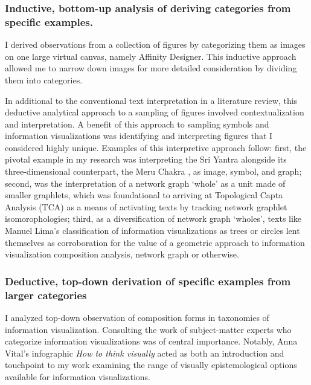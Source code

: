 \subsubsection{Inductive, bottom-up analysis of deriving categories from specific examples.}
I derived observations from a collection of figures by categorizing them as images on one large virtual canvas, namely Affinity Designer. This inductive approach allowed me to narrow down images for more detailed consideration by dividing them into categories. 

In additional to the conventional text interpretation in a literature review, this deductive analytical approach to a sampling of figures involved contextualization and interpretation. A benefit of this approach to sampling symbols and information visualizations was identifying and interpreting figures that I considered highly unique. Examples of this interpretive approach follow: first, the pivotal example in my research was interpreting the Sri Yantra alongside its three-dimensional counterpart, the Meru Chakra \citep[p. 31]{buhnemann_mandalas_2003}, as image, symbol, and graph; second, was the interpretation of a network graph `whole’ as a unit made of smaller graphlets, which was foundational to arriving at Topological Capta Analysis (TCA) as a means of activating texts by tracking network graphlet isomorophologies; third, as a diversification of network graph `wholes’, texts like Manuel Lima’s classification of information visualizations as trees or circles \citep{lima_book_2014,lima_book_2017} lent themselves as corroboration for the value of a geometric approach to information visualization composition analysis, network graph or otherwise. 
 


\subsubsection{Deductive, top-down derivation of specific examples from larger categories}
I analyzed top-down observation of composition forms in taxonomies of information visualization. Consulting the work of subject-matter experts who categorize information visualizations was of central importance. Notably, Anna Vital’s infographic \textit{How to think visually} \citep{vital_how_2018} acted as both an introduction and touchpoint to my work examining the range of visually epistemological options available for information visualizations. 

